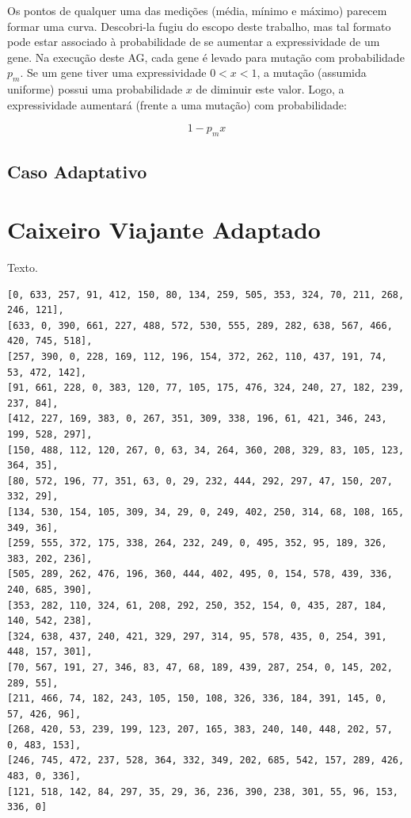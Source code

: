 Os pontos de qualquer uma das medições (média, mínimo e máximo) parecem formar uma curva. Descobri-la fugiu do escopo deste trabalho, mas tal formato pode estar associado à probabilidade de se aumentar a expressividade de um gene. Na execução deste AG, cada gene é levado para mutação com probabilidade $p_m$. Se um gene tiver uma expressividade $0 < x < 1$, a mutação (assumida uniforme) possui uma probabilidade $x$ de diminuir este valor. Logo, a expressividade aumentará (frente a uma mutação) com probabilidade:

\begin{equation}
	1 - p_mx
\end{equation}

\subsection{Caso Adaptativo}



\section{Caixeiro Viajante Adaptado}

Texto.

\begin{lstlisting}[float, floatplacement=H, caption={Mapa de cidades para o problema do Caixeiro Viajante Adaptado.}, label=lst:cidades]
[0, 633, 257, 91, 412, 150, 80, 134, 259, 505, 353, 324, 70, 211, 268, 246, 121],
[633, 0, 390, 661, 227, 488, 572, 530, 555, 289, 282, 638, 567, 466, 420, 745, 518],
[257, 390, 0, 228, 169, 112, 196, 154, 372, 262, 110, 437, 191, 74, 53, 472, 142],
[91, 661, 228, 0, 383, 120, 77, 105, 175, 476, 324, 240, 27, 182, 239, 237, 84],
[412, 227, 169, 383, 0, 267, 351, 309, 338, 196, 61, 421, 346, 243, 199, 528, 297],
[150, 488, 112, 120, 267, 0, 63, 34, 264, 360, 208, 329, 83, 105, 123, 364, 35],
[80, 572, 196, 77, 351, 63, 0, 29, 232, 444, 292, 297, 47, 150, 207, 332, 29],
[134, 530, 154, 105, 309, 34, 29, 0, 249, 402, 250, 314, 68, 108, 165, 349, 36],
[259, 555, 372, 175, 338, 264, 232, 249, 0, 495, 352, 95, 189, 326, 383, 202, 236],
[505, 289, 262, 476, 196, 360, 444, 402, 495, 0, 154, 578, 439, 336, 240, 685, 390],
[353, 282, 110, 324, 61, 208, 292, 250, 352, 154, 0, 435, 287, 184, 140, 542, 238],
[324, 638, 437, 240, 421, 329, 297, 314, 95, 578, 435, 0, 254, 391, 448, 157, 301],
[70, 567, 191, 27, 346, 83, 47, 68, 189, 439, 287, 254, 0, 145, 202, 289, 55],
[211, 466, 74, 182, 243, 105, 150, 108, 326, 336, 184, 391, 145, 0, 57, 426, 96],
[268, 420, 53, 239, 199, 123, 207, 165, 383, 240, 140, 448, 202, 57, 0, 483, 153],
[246, 745, 472, 237, 528, 364, 332, 349, 202, 685, 542, 157, 289, 426, 483, 0, 336],
[121, 518, 142, 84, 297, 35, 29, 36, 236, 390, 238, 301, 55, 96, 153, 336, 0]
\end{lstlisting}